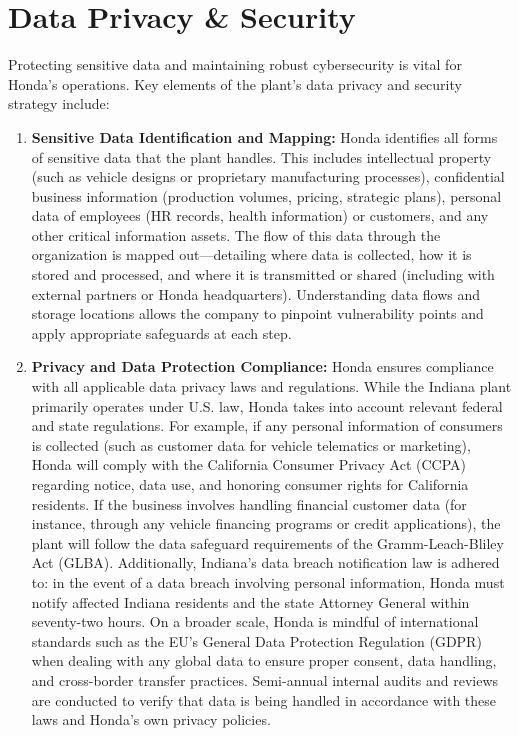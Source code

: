 \section{Data Privacy \& Security}
Protecting sensitive data and maintaining robust cybersecurity is vital for Honda’s operations. Key elements of the plant’s data privacy and security strategy include:
\begin{enumerate}
    \item \textbf{Sensitive Data Identification and Mapping:} Honda identifies all forms of sensitive data that the plant handles. This includes intellectual property (such as vehicle designs or proprietary manufacturing processes), confidential business information (production volumes, pricing, strategic plans), personal data of employees (HR records, health information) or customers, and any other critical information assets. The flow of this data through the organization is mapped out---detailing where data is collected, how it is stored and processed, and where it is transmitted or shared (including with external partners or Honda headquarters). Understanding data flows and storage locations allows the company to pinpoint vulnerability points and apply appropriate safeguards at each step.
    \item \textbf{Privacy and Data Protection Compliance:} Honda ensures compliance with all applicable data privacy laws and regulations. While the Indiana plant primarily operates under U.S. law, Honda takes into account relevant federal and state regulations. For example, if any personal information of consumers is collected (such as customer data for vehicle telematics or marketing), Honda will comply with the California Consumer Privacy Act (CCPA) regarding notice, data use, and honoring consumer rights for California residents. If the business involves handling financial customer data (for instance, through any vehicle financing programs or credit applications), the plant will follow the data safeguard requirements of the Gramm-Leach-Bliley Act (GLBA). Additionally, Indiana’s data breach notification law is adhered to: in the event of a data breach involving personal information, Honda must notify affected Indiana residents and the state Attorney General within seventy-two hours. On a broader scale, Honda is mindful of international standards such as the EU’s General Data Protection Regulation (GDPR) when dealing with any global data to ensure proper consent, data handling, and cross-border transfer practices. Semi-annual internal audits and reviews are conducted to verify that data is being handled in accordance with these laws and Honda’s own privacy policies.

\end{enumerate}
